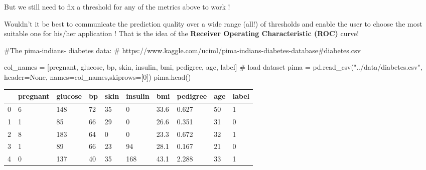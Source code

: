 \documentclass[
  letterpaper,
  DIV=11,
  numbers=noendperiod]{scrreprt}
\newenvironment{Shaded}{\begin{snugshade}}{\end{snugshade}}
\newcommand{\CommentTok}[1]{\textcolor[rgb]{0.37,0.37,0.37}{#1}}
\newcommand{\DecValTok}[1]{\textcolor[rgb]{0.68,0.00,0.00}{#1}}
\newcommand{\NormalTok}[1]{\textcolor[rgb]{0.00,0.23,0.31}{#1}}
\newcommand{\OperatorTok}[1]{\textcolor[rgb]{0.37,0.37,0.37}{#1}}
\newcommand{\StringTok}[1]{\textcolor[rgb]{0.13,0.47,0.30}{#1}}
\newcommand{\VariableTok}[1]{\textcolor[rgb]{0.07,0.07,0.07}{#1}}
\begin{document}
But we still need to fix a threshold for any of the metrics above to
work !

Wouldn't it be best to communicate the prediction quality over a wide
range (all!) of thresholds and enable the user to choose the most
suitable one for his/her application ! That is the idea of the
\textbf{Receiver Operating Characteristic (ROC)} curve!

\begin{Shaded}
\begin{Highlighting}[]
\CommentTok{\#The pima{-}indians{-} diabetes data:}
\CommentTok{\#  https://www.kaggle.com/uciml/pima{-}indians{-}diabetes{-}database\#diabetes.csv}

\NormalTok{col\_names }\OperatorTok{=}\NormalTok{ [}\StringTok{\textquotesingle{}pregnant\textquotesingle{}}\NormalTok{, }\StringTok{\textquotesingle{}glucose\textquotesingle{}}\NormalTok{, }\StringTok{\textquotesingle{}bp\textquotesingle{}}\NormalTok{, }\StringTok{\textquotesingle{}skin\textquotesingle{}}\NormalTok{, }\StringTok{\textquotesingle{}insulin\textquotesingle{}}\NormalTok{, }\StringTok{\textquotesingle{}bmi\textquotesingle{}}\NormalTok{, }\StringTok{\textquotesingle{}pedigree\textquotesingle{}}\NormalTok{, }\StringTok{\textquotesingle{}age\textquotesingle{}}\NormalTok{, }\StringTok{\textquotesingle{}label\textquotesingle{}}\NormalTok{]}
\CommentTok{\# load dataset}
\NormalTok{pima }\OperatorTok{=}\NormalTok{ pd.read\_csv(}\StringTok{"../data/diabetes.csv"}\NormalTok{, header}\OperatorTok{=}\VariableTok{None}\NormalTok{, names}\OperatorTok{=}\NormalTok{col\_names,skiprows}\OperatorTok{=}\NormalTok{[}\DecValTok{0}\NormalTok{])}
\NormalTok{pima.head()}
\end{Highlighting}
\end{Shaded}

\begin{longtable}[]{@{}llllllllll@{}}
\toprule()
& pregnant & glucose & bp & skin & insulin & bmi & pedigree & age &
label \\
\midrule()
\endhead
0 & 6 & 148 & 72 & 35 & 0 & 33.6 & 0.627 & 50 & 1 \\
1 & 1 & 85 & 66 & 29 & 0 & 26.6 & 0.351 & 31 & 0 \\
2 & 8 & 183 & 64 & 0 & 0 & 23.3 & 0.672 & 32 & 1 \\
3 & 1 & 89 & 66 & 23 & 94 & 28.1 & 0.167 & 21 & 0 \\
4 & 0 & 137 & 40 & 35 & 168 & 43.1 & 2.288 & 33 & 1 \\
\bottomrule()
\end{longtable}
\end{document}
